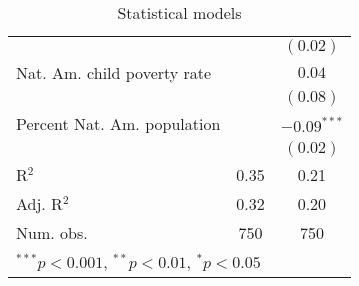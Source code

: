 \begin{table}
\begin{center}
\begin{tabular}{l c c }
                            &             & $(0.02)$      \\
Nat. Am. child poverty rate &             & $0.04$        \\
                            &             & $(0.08)$      \\
Percent Nat. Am. population &             & $-0.09^{***}$ \\
                            &             & $(0.02)$      \\
\hline
R$^2$                       & 0.35        & 0.21          \\
Adj. R$^2$                  & 0.32        & 0.20          \\
Num. obs.                   & 750         & 750           \\
\hline
\multicolumn{3}{l}{\scriptsize{$^{***}p<0.001$, $^{**}p<0.01$, $^*p<0.05$}}
\end{tabular}
\caption{Statistical models}
\label{table:coefficients}
\end{center}
\end{table}
